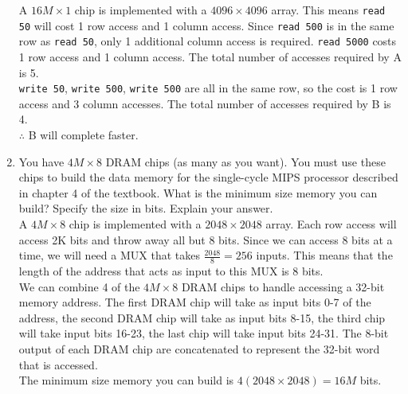 \documentclass[10pt,letterpaper]{article}
\begin{document}
\begin{enumerate}[label=\textbf{Problem \arabic*.}]
A $16M\times 1$ chip is implemented with a $4096 \times 4096$ array. 
This means \texttt{read 50} will cost 1 row access and 1 column access. Since \texttt{read 500} is in the same row as \texttt{read 50}, only 1 additional column access is required. \texttt{read 5000} costs 1 row access and 1 column access. The total number of accesses required by A is 5.\\
\texttt{write 50}, \texttt{write 500}, \texttt{write 500} are all in the same row, so the cost is 1 row access and 3 column accesses. The total number of accesses required by B is 4.\\
$\therefore$ B will complete faster.
\item You have $4M\times8$ DRAM chips (as many as you want). You must use these chips to build the data memory for the single-cycle MIPS processor described in chapter 4 of the textbook. What is the minimum size memory you can build? Specify the size in bits. Explain your answer.\\
A $4M\times8$ chip is implemented with a $2048\times2048$ array. Each row access will access 2K bits and throw away all but 8 bits. Since we can access 8 bits at a time, we will need a MUX that takes $\frac{2048}{8}=256$ inputs. This means that the length of the address that acts as input to this MUX is 8 bits.\\
We can combine 4 of the $4M\times8$ DRAM chips to handle accessing a 32-bit memory address. The first DRAM chip will take as input bits 0-7 of the address, the second DRAM chip will take as input bits 8-15, the third chip will take input bits 16-23, the last chip will take input bits 24-31. The 8-bit output of each DRAM chip are concatenated to represent the 32-bit word that is accessed.\\
The minimum size memory you can build is $4(2048\times2048)=16M$ bits.
\end{enumerate}
\end{document}
